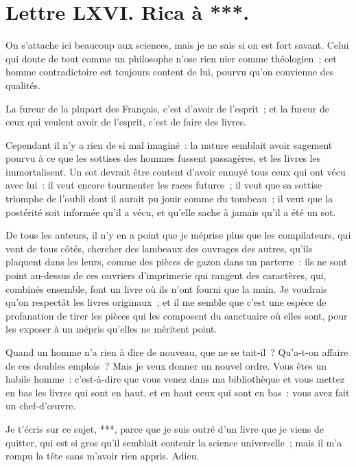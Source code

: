 \documentclass[french,twoside]{book} %
\newcommand{\dateline}[1]{\medskip{\RaggedLeft{#1}\par}\bigskip}
\begin{document}
\dateline{À Paris, le 5 de la lune de Chahban, 1714.}
\section[{Lettre LXVI. Rica à ***.}]{Lettre LXVI. Rica à ***.}\renewcommand{\leftmark}{Lettre LXVI. Rica à ***.}

\noindent On s’attache ici beaucoup aux sciences, mais je ne sais si on est fort savant. Celui qui doute de tout comme un philosophe n’ose rien nier comme théologien ; cet homme contradictoire est toujours content de lui, pourvu qu’on convienne des qualités.\par
La fureur de la plupart des Français, c’est d’avoir de l’esprit ; et la fureur de ceux qui veulent avoir de l’esprit, c’est de faire des livres.\par
Cependant il n’y a rien de si mal imaginé : la nature semblait avoir sagement pourvu à ce que les sottises des hommes fussent passagères, et les livres les immortalisent. Un sot devrait être content d’avoir ennuyé tous ceux qui ont vécu avec lui : il veut encore tourmenter les races futures ; il veut que sa sottise triomphe de l’oubli dont il aurait pu jouir comme du tombeau ; il veut que la postérité soit informée qu’il a vécu, et qu’elle sache à jamais qu’il a été un sot.\par
De tous les auteurs, il n’y en a point que je méprise plus que les compilateurs, qui vont de tous côtés, chercher des lambeaux des ouvrages des autres, qu’ils plaquent dans les leurs, comme des pièces de gazon dans un parterre : ils ne sont point au-dessus de ces ouvriers d’imprimerie qui rangent des caractères, qui, combinés ensemble, font un livre où ils n’ont fourni que la main. Je voudrais qu’on respectât les livres originaux ; et il me semble que c’est une espèce de profanation de tirer les pièces qui les composent du sanctuaire où elles sont, pour les exposer à un mépris qu’elles ne méritent point.\par
Quand un homme n’a rien à dire de nouveau, que ne se tait-il ? Qu’a-t-on affaire de ces doubles emplois ? Mais je veux donner un nouvel ordre. Vous êtes un habile homme : c’est-à-dire que vous venez dans ma bibliothèque et vous mettez en bas les livres qui sont en haut, et en haut ceux qui sont en bas : vous avez fait un chef-d’œuvre.\par
Je t’écris sur ce sujet, ***, parce que je suis outré d’un livre que je viens de quitter, qui est si gros qu’il semblait contenir la science universelle ; mais il m’a rompu la tête sans m’avoir rien appris. Adieu.\par
\end{document}
